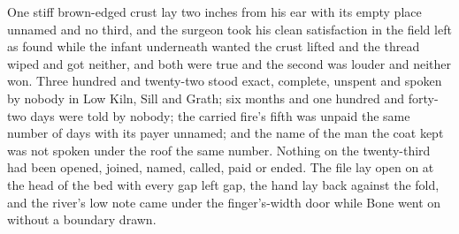 One stiff brown-edged crust lay two inches from his ear with its empty place unnamed and no third, and the surgeon took his clean satisfaction in the field left as found while the infant underneath wanted the crust lifted and the thread wiped and got neither, and both were true and the second was louder and neither won. Three hundred and twenty-two stood exact, complete, unspent and spoken by nobody in Low Kiln, Sill and Grath; six months and one hundred and forty-two days were told by nobody; the carried fire's fifth was unpaid the same number of days with its payer unnamed; and the name of the man the coat kept was not spoken under the roof the same number. Nothing on the twenty-third had been opened, joined, named, called, paid or ended. The file lay open on  at the head of the bed with every gap left gap, the hand lay back against the fold, and the river's low note came under the finger's-width door while Bone went on without a boundary drawn.
